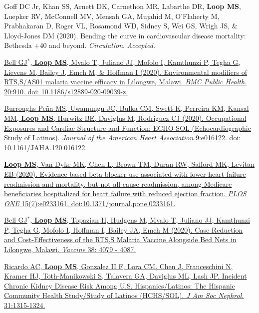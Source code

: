\documentclass[10pt,letterpaper]{article}
\begin{document}
\begin{etaremune}
\item Goff DC Jr, Khan SS, Arnett DK, Carnethon MR, Labarthe DR, \textbf{Loop MS}, Luepker RV, McConnell MV, Mensah GA, Mujahid M, O'Flaherty M, Prabhakaran D, Roger VL, Rosamond WD, Sidney S, Wei GS, Wrigh JS, \& Lloyd-Jones DM (2020). Bending the curve in cardiovascular disease mortality: Bethesda $+40$ and beyond. \emph{Circulation}. \emph{Accepted}.

\item \href{https://bmcpublichealth.biomedcentral.com/articles/10.1186/s12889-020-09039-z}{Bell GJ$^*$, \textbf{Loop MS}, Mvalo T, Juliano JJ, Mofolo I, Kamthunzi P, Tegha G, Lievens M, Bailey J, Emch M, \& Hoffman I (2020). Environmental modifiers of RTS,S/AS01 malaria vaccine efficacy in Lilongwe, Malawi. \emph{BMC Public Health}. 20:910. doi: 10.1186/s12889-020-09039-z.}

\item \href{https://www.ahajournals.org/doi/pdf/10.1161/JAHA.120.016122}{Burroughs Pe\~{n}a MS, Uwamungu JC, Bulka CM, Swett K, Perreira KM, Kansal MM, \textbf{Loop MS}, Hurwitz BE, Daviglus M, Rodriguez CJ (2020). Occupational Exposures and Cardiac Structure and Function: ECHO-SOL (Echocardiographic Study of Latinos). \emph{Journal of the American Heart Association} 9:e016122. doi: 10.1161/JAHA.120.016122.}

\item \href{https://journals.plos.org/plosone/article?id=10.1371/journal.pone.0233161}{\textbf{Loop MS}, Van Dyke MK, Chen L, Brown TM, Duran RW, Safford MK, Levitan EB (2020). Evidence-based beta blocker use associated with lower heart failure readmission and mortality, but not all-cause readmission, among Medicare beneficiaries hospitalized for heart failure with reduced ejection fraction. \emph{PLOS ONE} 15(7):e0233161. doi:10.1371/journal.pone.0233161.}

\item \href{https://www.sciencedirect.com/science/article/pii/S0264410X20305119}{Bell GJ$^*$, \textbf{Loop MS}, Topazian H, Hudgens M, Mvalo T, Juliano JJ, Kamthunzi P, Tegha G, Mofolo I, Hoffman I, Bailey JA, Emch M (2020). Case Reduction and Cost-Effectiveness of the RTS,S Malaria Vaccine Alongside Bed Nets in Lilongwe, Malawi. \emph{Vaccine} 38: 4079 - 4087.}

\item \href{https://jasn.asnjournals.org/content/jnephrol/31/6/1315.full.pdf}{Ricardo AC, \textbf{Loop MS}, Gonzalez II F, Lora CM, Chen J, Franceschini N, Kramer HJ, Toth-Manikowski S, Talavera GA, Daviglus ML, Lash JP. Incident Chronic Kidney Disease Risk Among U.S. Hispanics/Latinos: The Hispanic Community Health Study/Study of Latinos (HCHS/SOL). \emph{J Am Soc Nephrol.} 31:1315-1324.}


\end{etaremune}
\end{document}
